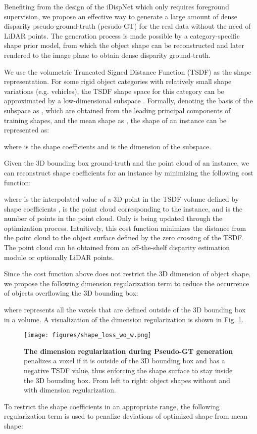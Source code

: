 \documentclass[10pt,twocolumn,letterpaper]{article}
\begin{document}
Benefiting from the design of the iDispNet which only requires foreground supervision, 
we propose an effective way to generate a large amount of dense disparity pseudo-ground-truth (pesudo-GT) for the real data without the need of LiDAR points.
The generation process is made possible by a category-specific shape prior model, from which the object shape can be reconstructed and later rendered to the image plane to obtain dense disparity ground-truth.

We use the volumetric Truncated Signed Distance Function (TSDF) as the shape representation.
For some rigid object categories with relatively small shape variations (e.g. vehicles), 
the TSDF shape space for this category can be approximated by a low-dimensional subspace \cite{leventon2002statistical, engelmann2016joint}.
Formally, denoting the basis of the subspace as , which are obtained from the leading principal components of training shapes, and the mean shape as , the shape  of an instance can be represented as:

where  is the shape coefficients and  is the dimension of the subspace.

Given the 3D bounding box ground-truth and the point cloud of an instance, we can reconstruct shape coefficients  for an instance by minimizing the following cost function:

where  is the interpolated value of a 3D point  in the TSDF volume defined by shape coefficients ,  is the point cloud corresponding to the instance, and  is the number of points in the point cloud.
Only  is being updated through the optimization process.
Intuitively, this cost function minimizes the distance from the point cloud to the object surface defined by the zero crossing of the TSDF.
The point cloud can be obtained from an off-the-shelf disparity estimation module or optionally LiDAR points.

Since the cost function above does not restrict the 3D dimension of object shape, we propose the following dimension regularization term to reduce the occurrence of objects overflowing the 3D bounding box:

where  represents all the voxels that are defined outside of the 3D bounding box in a volume.
A visualization of the dimension regularization is shown in Fig. \ref{fig:dim-reg}.
\begin{figure}[tb]
    \centering
    \texttt{[image: figures/shape\_loss\_wo\_w.png]}
    \caption{
        \textbf{The dimension regularization during Pseudo-GT generation}  penalizes a voxel if it is outside of the 3D bounding box and has a negative TSDF value,
        thus enforcing the shape surface to stay inside the 3D bounding box.
        From left to right: object shapes without and with dimension regularization.
    }
    \label{fig:dim-reg}
\end{figure} 
To restrict the shape coefficients in an appropriate range, the following regularization term is used to penalize deviations of optimized shape from mean shape:
\end{document}
